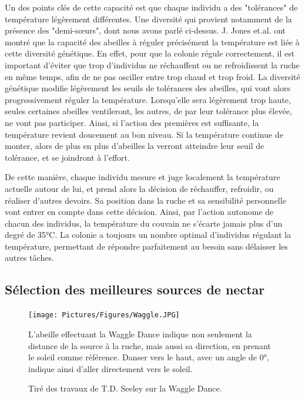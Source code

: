 			Un des points clés de cette capacité est que chaque individu a des "tolérances" de température légèrement différentes. Une diversité qui provient notamment de la présence des "demi-sœurs", dont nous avons parlé ci-dessus. J. Jones et.al. \cite{jones_honey_2004} ont montré que la capacité des abeilles à réguler précisément la température est liée à cette diversité génétique. En effet, pour que la colonie régule correctement, il est important d'éviter que trop d'individus ne réchauffent ou ne refroidissent la ruche en même temps, afin de ne pas osciller entre trop chaud et trop froid. La diversité génétique modifie légèrement les seuils de tolérances des abeilles, qui vont alors progressivement réguler la température. Lorsqu'elle sera légèrement trop haute, seules certaines abeilles ventileront, les autres, de par leur tolérance plus élevée, ne vont pas participer. Ainsi, si l'action des premières est suffisante, la température revient doucement au bon niveau. Si la température continue de monter, alors de plus en plus d'abeilles la verront atteindre leur seuil de tolérance, et se joindront à l'effort.
			
			De cette manière, chaque individu mesure et juge localement la température actuelle autour de lui, et prend alors la décision de réchauffer, refroidir, ou réaliser d'autres devoirs. Sa position dans la ruche et sa sensibilité personnelle vont entrer en compte dans cette décision. Ainsi, par l'action autonome de chacun des individus, la température du couvain ne s'écarte jamais plus d'un degré de 35°C. La colonie a toujours un nombre optimal d'individus régulant la température, permettant de répondre parfaitement au besoin sans délaisser les autres tâches.
			
			\subsection{Sélection des meilleures sources de nectar}
			
			\begin{figure}
			\centering
			\texttt{[image: Pictures/Figures/Waggle.JPG]}
				\caption{Tiré des travaux de T.D. Seeley \cite{seeley_wisdom_1995} sur la Waggle Dance.}{ L'abeille effectuant la Waggle Dance indique non seulement la distance de la source à la ruche, mais aussi sa direction, en prenant le soleil comme référence. Danser vers le haut, avec un angle de 0°, indique ainsi d'aller directement vers le soleil.}
			\label{Waggle}
			\end{figure}
			
